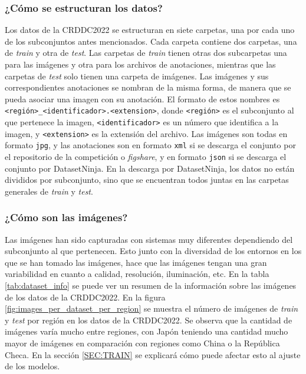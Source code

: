 \subsubsection{¿Cómo se estructuran los datos?}
Los datos de la CRDDC2022 se estructuran en siete carpetas, una por cada uno de los subconjuntos antes mencionados. Cada carpeta contiene dos carpetas, una de \textit{train} y otra de \textit{test}. Las carpetas de \textit{train} tienen otras dos subcarpetas una para las imágenes y otra para los archivos de anotaciones, mientras que las carpetas de \textit{test} solo tienen una carpeta de imágenes. Las imágenes y sus correspondientes anotaciones se nombran de la misma forma, de manera que se pueda asociar una imagen con su anotación. El formato de estos nombres es \texttt{<región>\_<identificador>.<extension>}, donde \texttt{<región>} es el subconjunto al que pertenece la imagen, \texttt{<identificador>} es un número que identifica a la imagen, y \texttt{<extension>} es la extensión del archivo. Las imágenes son todas en formato \texttt{jpg}, y las anotaciones son en formato \texttt{xml} si se descarga el conjunto por el repositorio de la competición o \textit{figshare}, y en formato \texttt{json} si se descarga el conjunto por DatasetNinja. En la descarga por DatasetNinja, los datos no están divididos por subconjunto, sino que se encuentran todos juntas en las carpetas generales de \textit{train} y \textit{test}.


\subsubsection{¿Cómo son las imágenes?}
Las imágenes han sido capturadas con sistemas muy diferentes dependiendo del subconjunto al que pertenecen. Esto junto con la diversidad de los entornos en los que se han tomado las imágenes, hace que las imágenes tengan una gran variabilidad en cuanto a calidad, resolución, iluminación, etc. En la tabla \ref{tab:dataset_info} se puede ver un resumen de la información sobre las imágenes de los datos de la CRDDC2022. En la figura \ref{fig:images_per_dataset_per_region} se muestra el número de imágenes de \textit{train} y \textit{test} por región en los datos de la CRDDC2022. Se observa que la cantidad de imágenes varía mucho entre regiones, con Japón teniendo una cantidad mucho mayor de imágenes en comparación con regiones como China o la República Checa. En la sección \ref{SEC:TRAIN} se explicará cómo puede afectar esto al ajuste de los modelos.

